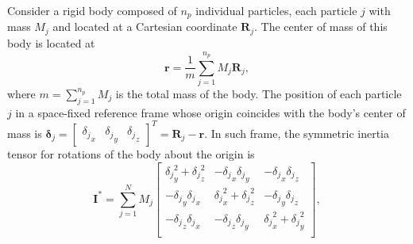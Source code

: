 \documentclass[aip,jcp,reprint,amsmath,amssymb]{revtex4-1}
\newcommand{\mt}[1]{\boldsymbol{\mathbf{#1}}}           %
\newcommand{\vt}[1]{\boldsymbol{\mathbf{#1}}}           %
\newcommand{\tr}[1]{#1^T}                               %
\begin{document}
Consider a rigid body composed of $n_p$ individual particles, each particle $j$ with mass $M_j$ and located at a Cartesian coordinate $\vt R_j$. The center of mass of this body is located at
\[
\vt r = \frac{1}{m}\sum_{j=1}^{n_p} M_j {\vt R}_j,
\]
where $m = \sum_{j=1}^{n_p} M_j$ is the total mass of the body. The position of each particle $j$ in a space-fixed reference frame whose origin coincides with the body's center of mass is ${\vt \delta}_j = \tr{ [\begin{array}{ccc} {\delta_j}_x & {\delta_j}_y & {\delta_j}_z \end{array}]} = {\vt R}_j - {\vt r}$. In such frame, the symmetric inertia tensor for rotations of the body about the origin is\cite{Goldstein2002}
\[
{\mt I}^\ast = \sum_{j=1}^N M_j \left[ \begin{array}{ccc}
{\delta_j}_y^2 + {\delta_j}_z^2 & -{\delta_j}_x {\delta_j}_y & -{\delta_j}_x {\delta_j}_z \\
-{\delta_j}_y {\delta_j}_x & {\delta_j}_x^2 + {\delta_j}_z^2 & -{\delta_j}_y {\delta_j}_z \\
-{\delta_j}_z {\delta_j}_x & -{\delta_j}_z {\delta_j}_y & {\delta_j}_x^2 + {\delta_j}_y^2 \\
\end{array} \right],
\]
\end{document}
